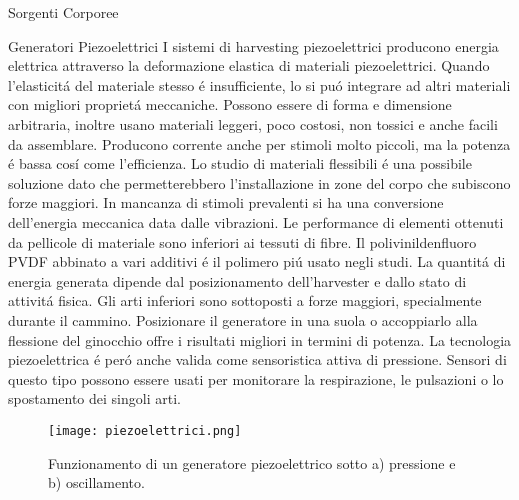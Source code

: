 \begin{section}{Sorgenti Corporee}
   \begin{subsection}{Generatori Piezoelettrici}
    I sistemi di harvesting piezoelettrici producono energia elettrica attraverso la deformazione elastica di materiali piezoelettrici. Quando l'elasticit\'a del materiale stesso \'e insufficiente, lo si pu\'o integrare ad altri materiali con migliori propriet\'a meccaniche. Possono essere di forma e dimensione arbitraria, inoltre usano materiali leggeri, poco costosi, non tossici e anche facili da assemblare. Producono corrente anche per stimoli molto piccoli, ma la potenza \'e bassa cos\'i come l'efficienza. Lo studio di materiali flessibili \'e una possibile soluzione dato che permetterebbero l'installazione in zone del corpo che subiscono forze maggiori. In mancanza di stimoli prevalenti si ha una conversione dell'energia meccanica data dalle vibrazioni. Le performance di elementi ottenuti da pellicole di materiale sono inferiori ai tessuti di fibre. Il polivinildenfluoro PVDF abbinato a vari additivi \'e il polimero pi\'u usato negli studi. La quantit\'a di energia generata dipende dal posizionamento dell'harvester e dallo stato di attivit\'a fisica. Gli arti inferiori sono sottoposti a forze maggiori, specialmente durante il cammino. Posizionare il generatore in una suola o accoppiarlo alla flessione del ginocchio offre i risultati migliori in termini di potenza. La tecnologia piezoelettrica \'e per\'o anche valida come sensoristica attiva di pressione. Sensori di questo tipo possono essere usati per monitorare la respirazione, le pulsazioni o lo spostamento dei singoli arti.
    \begin{figure}[H]
        \texttt{[image: piezoelettrici.png]}
        \centering
        \caption{Funzionamento di un generatore piezoelettrico sotto a) pressione e b) oscillamento.}
        \label{fig:piezoelettrici}
    \end{figure}
   \end{subsection}


\end{section}
